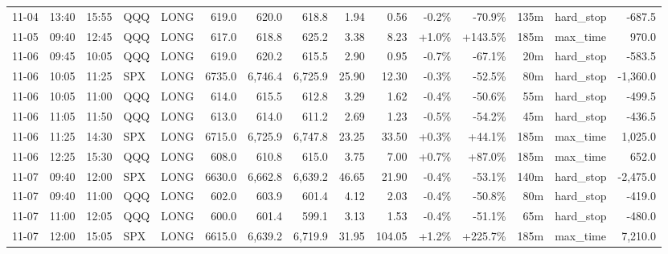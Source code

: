 \documentclass[11pt,a4paper,twoside]{article}
\begin{document}
\begin{landscape}
\begin{center}
\begin{longtable}{>{\color{txtmain}}l l l l l r r r r r r r r >{\color{txtmain}}l r}
11-04 & 13:40 & 15:55 & QQQ & LONG & 619.0 & 620.0 & 618.8 & 1.94 & 0.56 & \textcolor{lossred}{-0.2\%} & \textcolor{lossred}{-70.9\%} & 135m & hard\_stop & \textcolor{lossred}{-687.5} \\
11-05 & 09:40 & 12:45 & QQQ & LONG & 617.0 & 618.8 & 625.2 & 3.38 & 8.23 & \textcolor{wingreen}{+1.0\%} & \textcolor{wingreen}{+143.5\%} & 185m & max\_time & \textcolor{wingreen}{970.0} \\
11-06 & 09:45 & 10:05 & QQQ & LONG & 619.0 & 620.2 & 615.5 & 2.90 & 0.95 & \textcolor{lossred}{-0.7\%} & \textcolor{lossred}{-67.1\%} & 20m & hard\_stop & \textcolor{lossred}{-583.5} \\
11-06 & 10:05 & 11:25 & SPX & LONG & 6735.0 & 6,746.4 & 6,725.9 & 25.90 & 12.30 & \textcolor{lossred}{-0.3\%} & \textcolor{lossred}{-52.5\%} & 80m & hard\_stop & \textcolor{lossred}{-1,360.0} \\
11-06 & 10:05 & 11:00 & QQQ & LONG & 614.0 & 615.5 & 612.8 & 3.29 & 1.62 & \textcolor{lossred}{-0.4\%} & \textcolor{lossred}{-50.6\%} & 55m & hard\_stop & \textcolor{lossred}{-499.5} \\
11-06 & 11:05 & 11:50 & QQQ & LONG & 613.0 & 614.0 & 611.2 & 2.69 & 1.23 & \textcolor{lossred}{-0.5\%} & \textcolor{lossred}{-54.2\%} & 45m & hard\_stop & \textcolor{lossred}{-436.5} \\
11-06 & 11:25 & 14:30 & SPX & LONG & 6715.0 & 6,725.9 & 6,747.8 & 23.25 & 33.50 & \textcolor{wingreen}{+0.3\%} & \textcolor{wingreen}{+44.1\%} & 185m & max\_time & \textcolor{wingreen}{1,025.0} \\
11-06 & 12:25 & 15:30 & QQQ & LONG & 608.0 & 610.8 & 615.0 & 3.75 & 7.00 & \textcolor{wingreen}{+0.7\%} & \textcolor{wingreen}{+87.0\%} & 185m & max\_time & \textcolor{wingreen}{652.0} \\
11-07 & 09:40 & 12:00 & SPX & LONG & 6630.0 & 6,662.8 & 6,639.2 & 46.65 & 21.90 & \textcolor{lossred}{-0.4\%} & \textcolor{lossred}{-53.1\%} & 140m & hard\_stop & \textcolor{lossred}{-2,475.0} \\
11-07 & 09:40 & 11:00 & QQQ & LONG & 602.0 & 603.9 & 601.4 & 4.12 & 2.03 & \textcolor{lossred}{-0.4\%} & \textcolor{lossred}{-50.8\%} & 80m & hard\_stop & \textcolor{lossred}{-419.0} \\
11-07 & 11:00 & 12:05 & QQQ & LONG & 600.0 & 601.4 & 599.1 & 3.13 & 1.53 & \textcolor{lossred}{-0.4\%} & \textcolor{lossred}{-51.1\%} & 65m & hard\_stop & \textcolor{lossred}{-480.0} \\
11-07 & 12:00 & 15:05 & SPX & LONG & 6615.0 & 6,639.2 & 6,719.9 & 31.95 & 104.05 & \textcolor{wingreen}{+1.2\%} & \textcolor{wingreen}{+225.7\%} & 185m & max\_time & \textcolor{wingreen}{7,210.0} \\

\end{longtable}
\end{center}
\end{landscape}
\end{document}
